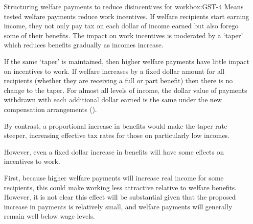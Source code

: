 \begin{bigboxC*}{Structuring welfare payments to reduce disincentives for work}{box:GST-4}
Means tested welfare payments reduce work incentives. If welfare recipients start earning income, they not only pay tax on each dollar of income earned but also forego some of their benefits. The impact on work incentives is moderated by a ‘taper’ which reduces benefits gradually as incomes increase.

If the same ‘taper’ is maintained, then higher welfare payments have little impact on incentives to work. If welfare increases by a fixed dollar amount for all recipients (whether they are receiving a full or part benefit) then there is no change to the taper. For almost all levels of income, the dollar value of payments withdrawn with each additional dollar earned is the same under the new compensation arrangements (). 

By contrast, a proportional increase in benefits would make the taper rate steeper, increasing effective tax rates for those on particularly low incomes.

However, even a fixed dollar increase in benefits will have some effects on incentives to work.  

First, because higher welfare payments will increase real income for some recipients, this could make working less attractive relative to welfare benefits. However, it is not clear this effect will be substantial given that the proposed increase in payments is relatively small, and welfare payments will generally remain well below wage levels. 


\end{bigboxC*}
